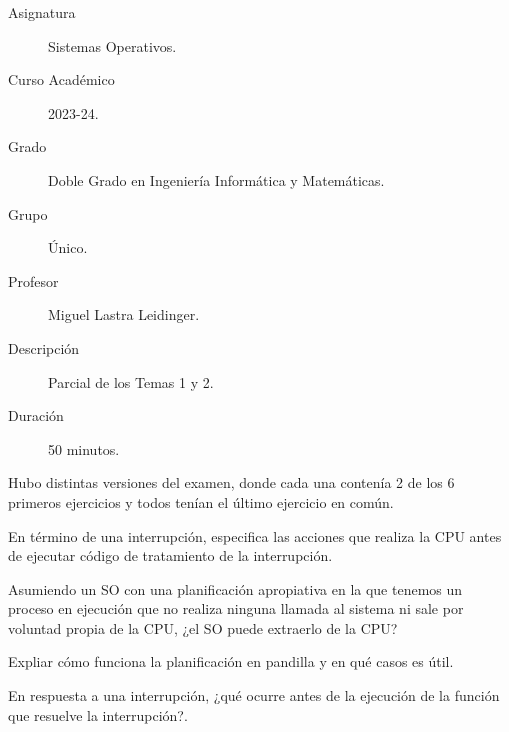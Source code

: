 \documentclass[12pt]{article}
\begin{document}

    
    

    \begin{description}
        \item[Asignatura] Sistemas Operativos.
        \item[Curso Académico] 2023-24.
        \item[Grado] Doble Grado en Ingeniería Informática y Matemáticas.
        \item[Grupo] Único.
        \item[Profesor] Miguel Lastra Leidinger.
        \item[Descripción] Parcial de los Temas 1 y 2.
        \item[Duración] 50 minutos.
    
    \end{description}
    \newpage
    
    \noindent
    Hubo distintas versiones del examen, donde cada una contenía 2 de los 6 primeros ejercicios y todos tenían el último ejercicio en común.

    \begin{ejercicio}
        En término de una interrupción, especifica las acciones que realiza la CPU antes de ejecutar código de tratamiento de la interrupción.
    \end{ejercicio}

    \begin{ejercicio}
        Asumiendo un SO con una planificación apropiativa en la que tenemos un proceso en ejecución que no realiza ninguna llamada al sistema ni sale por voluntad propia de la CPU, ¿el SO puede extraerlo de la CPU?
    \end{ejercicio}

    \begin{ejercicio}
        Expliar cómo funciona la planificación en pandilla y en qué casos es útil.
    \end{ejercicio}

    \begin{ejercicio}
        En respuesta a una interrupción, ¿qué ocurre antes de la ejecución de la función que resuelve la interrupción?.
    \end{ejercicio}
\end{document}
